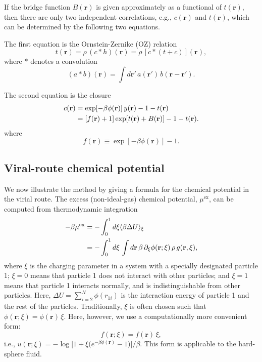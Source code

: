 \documentclass[aip,jcp,reprint,superscriptaddress]{revtex4-1}
\newcommand{\vct}[1]{\mathbf{#1}}
\providecommand{\vr}{} %
\renewcommand{\vr}{\vct{r}}
\newcommand{\supex}[1]{ { { #1 }^{ \mathrm{ex} } } }
\newcommand{\muex}{\supex{\mu}}
\begin{document}
If the bridge function $B(\vr)$ is given
approximately as a functional of $t(\vr)$,
then there are only two independent correlations,
e.g., $c(\vr)$ and $t(\vr)$, which can be determined
by the following two equations.

The first equation is the Ornstein-Zernike (OZ) relation
\begin{equation}
  t(\vr) = \rho \, (c * h)(\vr)
         = \rho \, [c * (t + c)] (\vr),
  \label{eq:oz}
\end{equation}
where $*$ denotes a convolution
\[
  (a * b)(\vr) = \int d\vr' \, a(\vr') \, b(\vr - \vr').
\]

The second equation is the closure
\begin{align}
  c(\vr)
  &= \exp[-\beta \phi(\vr)] \, y(\vr) - 1 - t(\vr) \notag \\
  &= [f(\vr) + 1] \exp[t(\vr) + B(\vr)] - 1 - t(\vr).
  \label{eq:closure}
\end{align}
where
\[
  f(\vr) \equiv \exp[-\beta \phi(\vr)] - 1.
\]



\subsection{Viral-route chemical potential}

We now illustrate the method by giving a formula for
the chemical potential in the virial route.
%
The excess (non-ideal-gas) chemical potential, $\muex$, can be computed from
thermodynamic integration
\begin{align}
  -\beta \muex
  &=
  -\int_0^1 d\xi \langle \beta \Delta U \rangle_\xi
  \notag \\
  &=
  -\int_0^1 d\xi \,
    \int d\vr \,
    \beta \, \partial_\xi \phi(\vr; \xi) \, \rho \, g(\vr, \xi),
  \label{eq:muti}
\end{align}
%
where $\xi$ is the charging parameter in a system with
a specially designated particle 1;
$\xi = 0$ means that particle 1 does not interact with other particles;
and $\xi = 1$ means that particle 1 interacts normally,
and is indistinguishable from other particles.
%
Here, $\Delta U = \sum_{i = 2}^N \phi(r_{1i})$
is the interaction energy of particle 1 and the rest of the particles.
%
Traditionally, $\xi$ is often chosen such that $\phi(\vr;\xi) = \phi(\vr) \, \xi$.
%
Here, however, we use a computationally more convenient form:
\begin{equation}
  f(\vr;\xi) = f(\vr) \, \xi,
\label{eq:fxi}
\end{equation}
i.e.,
$u(\vr; \xi) = -\log\Big[ 1 + \xi \big(e^{-\beta \phi(\vr)} -1\big) \Big]/\beta$.
This form is applicable to the hard-sphere fluid.
\end{document}
